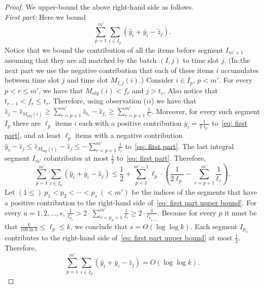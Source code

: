 \documentclass[12pt]{article}
\begin{document}
\begin{proof}
We upper-bound the above right-hand side as follows.\\
{\em First part:}\/ Here we bound
\begin{equation}\label{eq: first part}
\sum_{p=1}^{m'}\sum_{i\in I_p} \left(\hat{y}_i+\bar{y}_{i}-\hat{z}_j\right). 
\end{equation}
Notice that we bound the contribution of all the items before 
segment $I_{m'+1}$ assuming that they are all matched by the batch $(I,j)$
to time slot $j$. (In the next part we use the negative contribution that
each of these items $i$ accumulates between time slot $j$ and time
slot $M_{I,j}(i)$.)
Consider $i\in I_p$, $p< m'$. For every 
$p < r\le m'$, we have that $M_{alg}(i) < f_r$  and $j > t_r$.
Also notice that $t_{r-1} < f_r\le t_r$.
Therefore, using observation ($ii$) we have that
$\hat{z}_j-\hat{z}_{M_{alg}(i)} \ge \sum_{r=p+1}^{m'} \hat{z}_{t_r}-\hat{z}_{f_r}
\ge \sum_{r=p+1}^{m'}\frac{1}{\ell_r}$.
Moreover, for every such segment $I_p$
there are $\ell_p$ items $i$ each with a positive contribution
$\bar{y}_i = \frac{1}{2\ell_p}$ to~\eqref{eq: first part},
and at least $\ell_p$ items with a negative 
contribution 
$\hat{y}_i - \hat{z}_j\le \hat{z}_{M_{alg}(i)} - \hat{z}_j\le -\sum_{r=p+1}^{m'}\frac{1}{\ell_r}$
to~\eqref{eq: first part}.
The last integral segment $I_{m'}$ cobntributes at most $\frac 1 2$
to~\eqref{eq: first part}. Therefore,
\begin{equation}\label{eq: first part upper bound}
\sum_{p=1}^{m'}\sum_{i\in I_p} \left(\hat{y}_i+\bar{y}_{i}-\hat{z}_j\right)\le
\frac 1 2 +\sum_{p=1}^{m'-1}\ell_p\cdot\left(\frac{1}{2\ell_p}- \sum_{r=p+1}^{m'} \frac{1}{\ell_r}\right).
\end{equation}
Let $(1\le)\ p_1<p_2<\cdots<p_s\ (<m')$ be the indices of the segments
that have a positive contribution to the right-hand side of~\eqref{eq: first part upper bound}.
For every $u=1,2,\dots,s$, 
$\frac{1}{\ell_{p_u}} > 2\cdot \sum_{r=p_u+1}^{m'} 
\frac{1}{\ell_r}\ge 2\cdot\frac{1}{\ell_{p_{u+1}}}$.
Because for every $p$ it must be that $\frac{k}{100\ln k}\le \ell_p \le k$, 
we conclude that $s = O(\log \log k)$. Each segment $I_{p_u}$ contributes
to the right-hand side of~\eqref{eq: first part upper bound} at most $\frac 1 2$.
Therefore,
$$
\sum_{p=1}^{m'}\sum_{i\in I_p} \left(\hat{y}_i+\bar{y}_{i}-\hat{z}_j\right)
= O(\log \log k).
$$


\end{proof}
\end{document}
